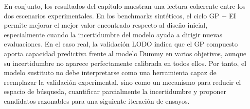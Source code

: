 En conjunto, los resultados del capítulo muestran una lectura coherente entre los dos escenarios experimentales. En los benchmarks sintéticos, el ciclo GP + EI permite mejorar el mejor valor encontrado respecto al diseño inicial, especialmente cuando la incertidumbre del modelo ayuda a dirigir nuevas evaluaciones. En el caso real, la validación LODO indica que el GP compuesto aporta capacidad predictiva frente al modelo Dummy en varios objetivos, aunque su incertidumbre no aparece perfectamente calibrada en todos ellos. Por tanto, el modelo sustituto no debe interpretarse como una herramienta capaz de reemplazar la validación experimental, sino como un mecanismo para reducir el espacio de búsqueda, cuantificar parcialmente la incertidumbre y proponer candidatos razonables para una siguiente iteración de ensayos.
